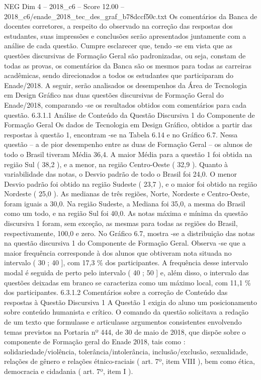 \begin{textsample}{NEG Dim 4 – 2018\_c6 – Score 12.00 – 2018\_c6/enade\_2018\_tec\_des\_graf\_b78dccf50c.txt}
Os comentários da Banca de docentes corretores, a respeito do observado na correção das respostas dos estudantes, suas impressões e conclusões serão apresentados juntamente com a análise de cada questão.
Cumpre esclarecer que, tendo -se em vista que as questões discursivas de Formação Geral são padronizadas, ou seja, constam de todas as provas, os comentários da Banca são os mesmos para todas as carreiras acadêmicas, sendo direcionados a todos os estudantes que participaram do Enade/2018.
A seguir, serão analisados os desempenhos da Área de Tecnologia em Design Gráfico nas duas questões discursivas de Formação Geral do Enade/2018, comparando -se os resultados obtidos com comentários para cada questão. 6.3.1.1 Análise de Conteúdo da Questão Discursiva 1 do Componente de Formação Geral Os dados de Tecnologia em Design Gráfico, obtidos a partir das respostas à questão 1, encontram -se na Tabela 6.14 e no Gráfico 6.7.
Nessa questão – a de pior desempenho entre as duas de Formação Geral – os alunos de todo o Brasil tiveram Média 36,4.
A maior Média para a questão 1 foi obtida na região Sul ( 38,2 ), e a menor, na região Centro-Oeste ( 32,9 ).
Quanto à variabilidade das notas, o Desvio padrão de todo o Brasil foi 24,0.
O menor Desvio padrão foi obtido na região Sudeste ( 23,7 ), e o maior foi obtido na região Nordeste ( 25,0 ).
As medianas de três regiões, Norte, Nordeste e Centro-Oeste, foram iguais a 30,0.
Na região Sudeste, a Mediana foi 35,0, a mesma do Brasil como um todo, e na região Sul foi 40,0.
As notas máxima e mínima da questão discursiva 1 foram, sem exceção, as mesmas para todas as regiões do Brasil, respectivamente, 100,0 e zero.
No Gráfico 6.7, mostra -se a distribuição das notas na questão discursiva 1 do Componente de Formação Geral.
Observa -se que a maior frequência corresponde à dos alunos que obtiveram nota situada no intervalo ( 30 ; 40 ], com 17,3 \% dos participantes.
A frequência desse intervalo modal é seguida de perto pelo intervalo ( 40 ; 50 ] e, além disso, o intervalo das questões deixadas em branco se caracteriza como um máximo local, com 11,1 \% dos participantes. 6.3.1.2 Comentários sobre a correção de Conteúdo das respostas à Questão Discursiva 1 A Questão 1 exigia do aluno um posicionamento sobre conteúdo humanista e crítico.
O comando da questão solicitava a redação de um texto que formulasse e articulasse argumentos consistentes envolvendo temas previstos na Portaria nº 444, de 30 de maio de 2018, que dispõe sobre o componente de Formação geral do Enade 2018, tais como : solidariedade/violência, tolerância/intolerância, inclusão/exclusão, sexualidade, relações de gênero e relações étnico-raciais ( art. 7º, item VIII ), bem como ética, democracia e cidadania ( art. 7º, item I ).

\end{textsample}
